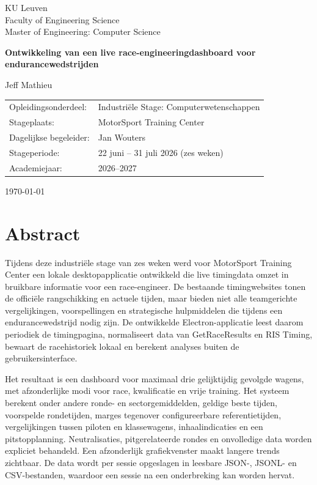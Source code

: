 \begin{titlepage}
  \centering
  \vspace*{2cm}
  {\Large KU Leuven\\Faculty of Engineering Science\\Master of Engineering: Computer Science\par}
  \vspace{2.5cm}
  {\Huge\bfseries Ontwikkeling van een live race-engineeringdashboard voor endurancewedstrijden\par}
  \vspace{2cm}
  {\Large Jeff Mathieu\par}
  \vfill
  \begin{tabular}{ll}
    Opleidingsonderdeel: & Industriële Stage: Computerwetenschappen \\
    Stageplaats: & MotorSport Training Center \\
    Dagelijkse begeleider: & Jan Wouters \\
    Stageperiode: & 22 juni -- 31 juli 2026 (zes weken) \\
    Academiejaar: & 2026--2027 \\
  \end{tabular}
  \vfill
  {\large \today\par}
\end{titlepage}

\chapter*{Abstract}
Tijdens deze industriële stage van zes weken werd voor MotorSport Training Center een lokale desktopapplicatie ontwikkeld die live timingdata omzet in bruikbare informatie voor een race-engineer. De bestaande timingwebsites tonen de officiële rangschikking en actuele tijden, maar bieden niet alle teamgerichte vergelijkingen, voorspellingen en strategische hulpmiddelen die tijdens een endurancewedstrijd nodig zijn. De ontwikkelde Electron-applicatie leest daarom periodiek de timingpagina, normaliseert data van GetRaceResults en RIS Timing, bewaart de racehistoriek lokaal en berekent analyses buiten de gebruikersinterface.

Het resultaat is een dashboard voor maximaal drie gelijktijdig gevolgde wagens, met afzonderlijke modi voor race, kwalificatie en vrije training. Het systeem berekent onder andere ronde- en sectorgemiddelden, geldige beste tijden, voorspelde rondetijden, marges tegenover configureerbare referentietijden, vergelijkingen tussen piloten en klassewagens, inhaalindicaties en een pitstopplanning. Neutralisaties, pitgerelateerde rondes en onvolledige data worden expliciet behandeld. Een afzonderlijk grafiekvenster maakt langere trends zichtbaar. De data wordt per sessie opgeslagen in leesbare JSON-, JSONL- en CSV-bestanden, waardoor een sessie na een onderbreking kan worden hervat.

